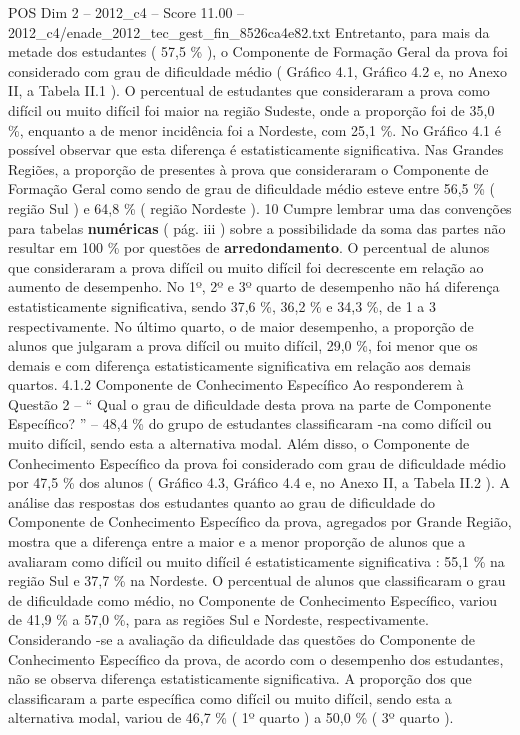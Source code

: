 \begin{textsample}{POS Dim 2 – 2012\_c4 – Score 11.00 – 2012\_c4/enade\_2012\_tec\_gest\_fin\_8526ca4e82.txt}
Entretanto, para mais da metade dos estudantes ( 57,5 \% ), o Componente de Formação Geral da prova foi considerado com grau de dificuldade médio ( Gráfico 4.1, Gráfico 4.2 e, no Anexo II, a Tabela II.1 ).
O percentual de estudantes que consideraram a prova como difícil ou muito difícil foi maior na região Sudeste, onde a proporção foi de 35,0 \%, enquanto a de menor incidência foi a Nordeste, com 25,1 \%.
No Gráfico 4.1 é possível observar que esta diferença é estatisticamente significativa.
Nas Grandes Regiões, a proporção de presentes à prova que consideraram o Componente de Formação Geral como sendo de grau de dificuldade médio esteve entre 56,5 \% ( região Sul ) e 64,8 \% ( região Nordeste ). 10 Cumpre lembrar uma das convenções para tabelas \textbf{numéricas} ( pág. iii ) sobre a possibilidade da soma das partes não resultar em 100 \% por questões de \textbf{arredondamento}.
O percentual de alunos que consideraram a prova difícil ou muito difícil foi decrescente em relação ao aumento de desempenho.
No 1º, 2º e 3º quarto de desempenho não há diferença estatisticamente significativa, sendo 37,6 \%, 36,2 \% e 34,3 \%, de 1 a 3 respectivamente.
No último quarto, o de maior desempenho, a proporção de alunos que julgaram a prova difícil ou muito difícil, 29,0 \%, foi menor que os demais e com diferença estatisticamente significativa em relação aos demais quartos. 4.1.2 Componente de Conhecimento Específico Ao responderem à Questão 2 – “ Qual o grau de dificuldade desta prova na parte de Componente Específico? ” – 48,4 \% do grupo de estudantes classificaram -na como difícil ou muito difícil, sendo esta a alternativa modal.
Além disso, o Componente de Conhecimento Específico da prova foi considerado com grau de dificuldade médio por 47,5 \% dos alunos ( Gráfico 4.3, Gráfico 4.4 e, no Anexo II, a Tabela II.2 ).
A análise das respostas dos estudantes quanto ao grau de dificuldade do Componente de Conhecimento Específico da prova, agregados por Grande Região, mostra que a diferença entre a maior e a menor proporção de alunos que a avaliaram como difícil ou muito difícil é estatisticamente significativa : 55,1 \% na região Sul e 37,7 \% na Nordeste.
O percentual de alunos que classificaram o grau de dificuldade como médio, no Componente de Conhecimento Específico, variou de 41,9 \% a 57,0 \%, para as regiões Sul e Nordeste, respectivamente.
Considerando -se a avaliação da dificuldade das questões do Componente de Conhecimento Específico da prova, de acordo com o desempenho dos estudantes, não se observa diferença estatisticamente significativa.
A proporção dos que classificaram a parte específica como difícil ou muito difícil, sendo esta a alternativa modal, variou de 46,7 \% ( 1º quarto ) a 50,0 \% ( 3º quarto ).

\end{textsample}
